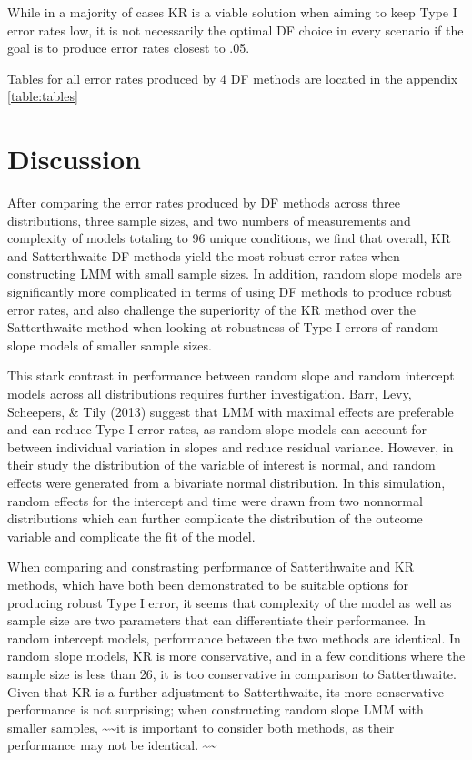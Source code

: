 \documentclass[12pt, twoside]{amherstthesis}
\begin{document}
While in a majority of cases KR is a viable solution when aiming to keep Type I error rates low, it is not necessarily the optimal DF choice in every scenario if the goal is to produce error rates closest to .05.

Tables for all error rates produced by 4 DF methods are located in the appendix \ref{table:tables}

\hypertarget{discussion}{%
\section{Discussion}\label{discussion}}

After comparing the error rates produced by DF methods across three distributions, three sample sizes, and two numbers of measurements and complexity of models totaling to 96 unique conditions, we find that overall, KR and Satterthwaite DF methods yield the most robust error rates when constructing LMM with small sample sizes. In addition, random slope models are significantly more complicated in terms of using DF methods to produce robust error rates, and also challenge the superiority of the KR method over the Satterthwaite method when looking at robustness of Type I errors of random slope models of smaller sample sizes.

This stark contrast in performance between random slope and random intercept models across all distributions requires further investigation. Barr, Levy, Scheepers, \& Tily (2013) suggest that LMM with maximal effects are preferable and can reduce Type I error rates, as random slope models can account for between individual variation in slopes and reduce residual variance. However, in their study the distribution of the variable of interest is normal, and random effects were generated from a bivariate normal distribution. In this simulation, random effects for the intercept and time were drawn from two nonnormal distributions which can further complicate the distribution of the outcome variable and complicate the fit of the model.

When comparing and constrasting performance of Satterthwaite and KR methods, which have both been demonstrated to be suitable options for producing robust Type I error, it seems that complexity of the model as well as sample size are two parameters that can differentiate their performance. In random intercept models, performance between the two methods are identical. In random slope models, KR is more conservative, and in a few conditions where the sample size is less than 26, it is too conservative in comparison to Satterthwaite. Given that KR is a further adjustment to Satterthwaite, its more conservative performance is not surprising; when constructing random slope LMM with smaller samples, \textasciitilde\textasciitilde it is important to consider both methods, as their performance may not be identical. \textasciitilde\textasciitilde{}
\end{document}
